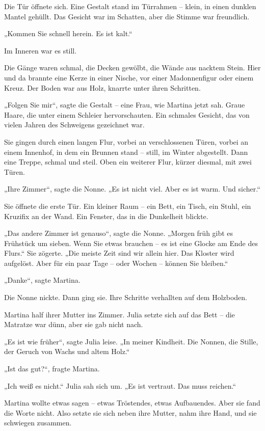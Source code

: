 \documentclass[
]{article}
\begin{document}
Die Tür öffnete sich. Eine Gestalt stand im Türrahmen -- klein, in einen dunklen Mantel gehüllt. Das Gesicht war im Schatten, aber die Stimme war freundlich.

„Kommen Sie schnell herein. Es ist kalt.``

Im Inneren war es still.

Die Gänge waren schmal, die Decken gewölbt, die Wände aus nacktem Stein. Hier und da brannte eine Kerze in einer Nische, vor einer Madonnenfigur oder einem Kreuz. Der Boden war aus Holz, knarrte unter ihren Schritten.

„Folgen Sie mir``, sagte die Gestalt -- eine Frau, wie Martina jetzt sah. Graue Haare, die unter einem Schleier hervorschauten. Ein schmales Gesicht, das von vielen Jahren des Schweigens gezeichnet war.

Sie gingen durch einen langen Flur, vorbei an verschlossenen Türen, vorbei an einem Innenhof, in dem ein Brunnen stand -- still, im Winter abgestellt. Dann eine Treppe, schmal und steil. Oben ein weiterer Flur, kürzer diesmal, mit zwei Türen.

„Ihre Zimmer``, sagte die Nonne. „Es ist nicht viel. Aber es ist warm. Und sicher.``

Sie öffnete die erste Tür. Ein kleiner Raum -- ein Bett, ein Tisch, ein Stuhl, ein Kruzifix an der Wand. Ein Fenster, das in die Dunkelheit blickte.

„Das andere Zimmer ist genauso``, sagte die Nonne. „Morgen früh gibt es Frühstück um sieben. Wenn Sie etwas brauchen -- es ist eine Glocke am Ende des Flurs.`` Sie zögerte. „Die meiste Zeit sind wir allein hier. Das Kloster wird aufgelöst. Aber für ein paar Tage -- oder Wochen -- können Sie bleiben.``

„Danke``, sagte Martina.

Die Nonne nickte. Dann ging sie. Ihre Schritte verhallten auf dem Holzboden.

Martina half ihrer Mutter ins Zimmer. Julia setzte sich auf das Bett -- die Matratze war dünn, aber sie gab nicht nach.

„Es ist wie früher``, sagte Julia leise. „In meiner Kindheit. Die Nonnen, die Stille, der Geruch von Wachs und altem Holz.``

„Ist das gut?{\kern0pt}``, fragte Martina.

„Ich weiß es nicht.`` Julia sah sich um. „Es ist vertraut. Das muss reichen.``

Martina wollte etwas sagen -- etwas Tröstendes, etwas Aufbauendes. Aber sie fand die Worte nicht. Also setzte sie sich neben ihre Mutter, nahm ihre Hand, und sie schwiegen zusammen.
\end{document}
